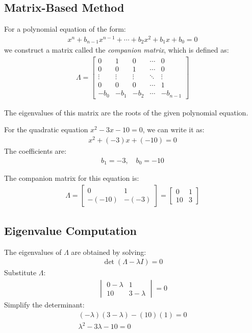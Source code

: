 \documentclass[journal]{IEEEtran}
\begin{document}
\subsection*{Matrix-Based Method}
For a polynomial equation of the form:
\begin{align}
    x^n + b_{n-1}x^{n-1} + \cdots + b_2x^2 + b_1x + b_0 = 0
\end{align}
we construct a matrix called the \textit{companion matrix}, which is defined as:
\begin{align}
    \Lambda =
    \begin{bmatrix}
        0 & 1 & 0 & \cdots & 0 \\
        0 & 0 & 1 & \cdots & 0 \\
        \vdots & \vdots & \vdots & \ddots & \vdots \\
        0 & 0 & 0 & \cdots & 1 \\
        -b_0 & -b_1 & -b_2 & \cdots & -b_{n-1}
    \end{bmatrix}
\end{align}

The eigenvalues of this matrix are the roots of the given polynomial equation.

For the quadratic equation \( x^2 - 3x - 10 = 0 \), we can write it as:
\begin{align}
    x^2 + (-3)x + (-10) = 0
\end{align}
The coefficients are:
\begin{align*}
    b_1 = -3, \quad b_0 = -10
\end{align*}

The companion matrix for this equation is:
\begin{align}
    \Lambda =
    \begin{bmatrix}
        0 & 1 \\
        -(-10) & -(-3)
    \end{bmatrix}
    =
    \begin{bmatrix}
        0 & 1 \\
        10 & 3
    \end{bmatrix}
\end{align}

\subsection*{Eigenvalue Computation}
The eigenvalues of \( \Lambda \) are obtained by solving:
\begin{align}
    \det(\Lambda - \lambda I) = 0
\end{align}
Substitute \( \Lambda \):
\begin{align}
    \begin{vmatrix}
        0 - \lambda & 1 \\
        10 & 3 - \lambda
    \end{vmatrix}
    = 0
\end{align}
Simplify the determinant:
\begin{align}
    (-\lambda)(3 - \lambda) - (10)(1) = 0 \\
    \lambda^2 - 3\lambda - 10 = 0
\end{align}
\end{document}

